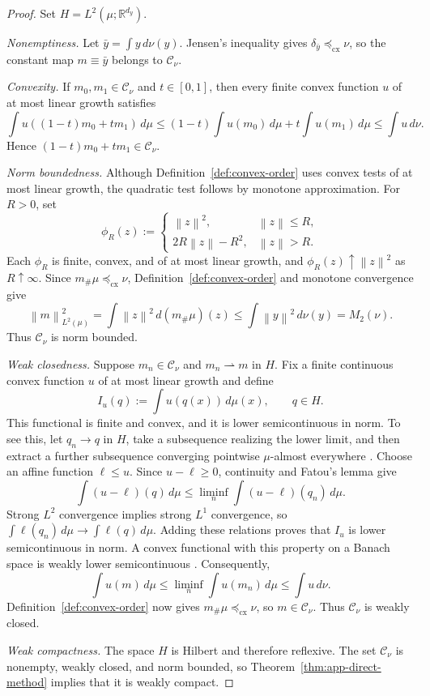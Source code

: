 \documentclass[11pt]{article}
\newcommand{\R}{\mathbb R}
\newcommand{\norm}[1]{\left\lVert #1\right\rVert}
\newcommand{\cx}{\preceq_{\mathrm{cx}}}
\theoremstyle{plain}
\theoremstyle{definition}
\theoremstyle{remark}
\begin{document}
\begin{proof}
Set $H=L^2(\mu;\R^{d_y})$.

\emph{Nonemptiness.}
Let $\bar y=\int y\,d\nu(y)$.  Jensen's inequality gives
$\delta_{\bar y}\cx\nu$, so the constant map $m\equiv\bar y$ belongs to
$\mathcal C_\nu$.

\emph{Convexity.}
If $m_0,m_1\in\mathcal C_\nu$ and $t\in[0,1]$, then every finite convex
function $u$ of at most linear growth satisfies
\[
 \int u((1-t)m_0+tm_1)\,d\mu
 \le(1-t)\int u(m_0)\,d\mu+t\int u(m_1)\,d\mu
 \le\int u\,d\nu.
\]
Hence $(1-t)m_0+tm_1\in\mathcal C_\nu$.

\emph{Norm boundedness.}
Although Definition~\ref{def:convex-order} uses convex tests of at most linear
growth, the quadratic test follows by monotone approximation.  For $R>0$, set
\[
 \phi_R(z):=
 \begin{cases}
  \norm z^2,&\norm z\le R,\\
  2R\norm z-R^2,&\norm z>R.
 \end{cases}
\]
Each $\phi_R$ is finite, convex, and of at most linear growth, and
$\phi_R(z)\uparrow\norm z^2$ as $R\uparrow\infty$.  Since
$m_\#\mu\cx\nu$, Definition~\ref{def:convex-order} and monotone convergence give
\[
 \norm{m}_{L^2(\mu)}^2
 =\int\norm{z}^2\,d(m_\#\mu)(z)
 \le\int\norm{y}^2\,d\nu(y)=M_2(\nu).
\]
Thus $\mathcal C_\nu$ is norm bounded.

\emph{Weak closedness.}
Suppose $m_n\in\mathcal C_\nu$ and $m_n\rightharpoonup m$ in $H$.  Fix a
finite continuous convex function $u$ of at most linear growth and define
\[
 I_u(q):=\int u(q(x))\,d\mu(x),\qquad q\in H.
\]
This functional is finite and convex, and it is lower semicontinuous in norm. To see
this, let $q_n\to q$ in $H$, take a subsequence realizing the lower limit,
and then extract a further subsequence converging pointwise $\mu$-almost
everywhere \cite[Theorem~4.9]{BrezisFA}.  Choose an affine function $\ell\le u$.
Since $u-\ell\ge0$,
continuity and Fatou's lemma give
\[
 \int (u-\ell)(q)\,d\mu
 \le\liminf_n\int (u-\ell)(q_n)\,d\mu.
\]
Strong $L^2$ convergence implies strong $L^1$ convergence, so
$\int\ell(q_n)\,d\mu\to\int\ell(q)\,d\mu$. Adding these relations proves that
$I_u$ is lower semicontinuous in norm. A convex functional with this property on a
Banach space is weakly lower semicontinuous
\cite[Corollary~3.9]{BrezisFA}.  Consequently,
\[
 \int u(m)\,d\mu
 \le\liminf_n\int u(m_n)\,d\mu
 \le\int u\,d\nu.
\]
Definition~\ref{def:convex-order} now gives $m_\#\mu\cx\nu$, so
$m\in\mathcal C_\nu$.  Thus $\mathcal C_\nu$ is weakly closed.

\emph{Weak compactness.}
The space $H$ is Hilbert and therefore reflexive.  The set $\mathcal C_\nu$ is
nonempty, weakly closed, and norm bounded, so
Theorem~\ref{thm:app-direct-method} implies that it is weakly compact.
\end{proof}
\end{document}
